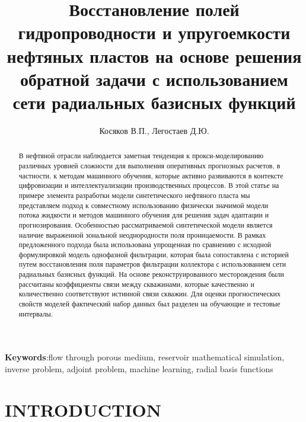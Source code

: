 \documentclass{article}
\begin{document}
\title{Восстановление полей гидропроводности и упругоемкости нефтяных пластов на основе решения обратной задачи с использованием сети радиальных базисных функций} %
\author{Косяков В.П., Легостаев Д.Ю.} %




\begin{abstract} %
В нефтяной отрасли наблюдается заметная тенденция к прокси-моделированию различных уровней сложности для выполнения оперативных прогнозных расчетов, в частности, к методам машинного обучения, которые активно развиваются в контексте цифровизации и интеллектуализации производственных процессов. В этой статье на примере элемента разработки модели синтетического нефтяного пласта мы представляем подход к совместному использованию физически значимой модели потока жидкости и методов машинного обучения для решения задач адаптации и прогнозирования. Особенностью рассматриваемой синтетической модели является наличие выраженной зональной неоднородности поля проницаемости. В рамках предложенного подхода была использована упрощенная по сравнению с исходной формулировкой модель однофазной фильтрации, которая была сопоставлена с историей путем восстановления поля параметров фильтрации коллектора с использованием сети радиальных базисных функций. На основе реконструированного месторождения были рассчитаны коэффициенты связи между скважинами, которые качественно и количественно соответствуют истинной связи скважин. Для оценки прогностических свойств моделей фактический набор данных был разделен на обучающие и тестовые интервалы.
\end{abstract}

\textbf{Keywords}:flow through porous medium, reservoir mathematical simulation, inverse problem, adjoint problem, machine learning, radial basis functions%

\maketitle

\section{INTRODUCTION}
\end{document}

